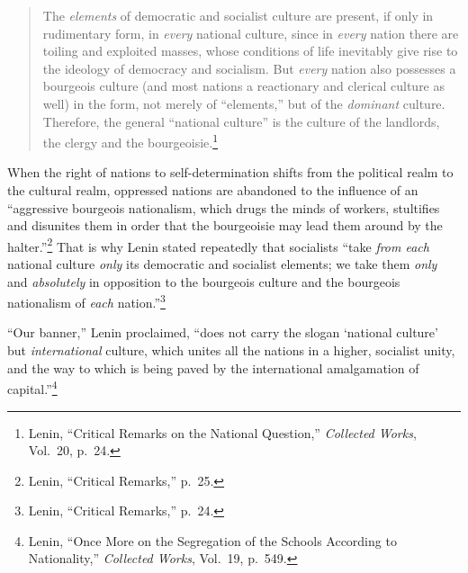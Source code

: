 \blockquote{The \emph{elements} of democratic and socialist culture are present, if only in rudimentary form, in \emph{every} national culture, since in \emph{every} nation there are toiling and exploited masses, whose conditions of life inevitably give rise to the ideology of democracy and socialism. But \emph{every} nation also possesses a bourgeois culture (and most nations a reactionary and clerical culture as well) in the form, not merely of ``elements,'' but of the \emph{dominant} culture. Therefore, the general ``national culture'' is the culture of the landlords, the clergy and the bourgeoisie.\footnote{Lenin, ``Critical Remarks on the National Question,'' \emph{Collected Works}, Vol.\ 20, p.\ 24.}}

When the right of nations to self-determination shifts from the political realm to the cultural realm, oppressed nations are abandoned to the influence of an ``aggressive bourgeois nationalism, which drugs the minds of workers, stultifies and disunites them in order that the bourgeoisie may lead them around by the halter.''\footnote{Lenin, ``Critical Remarks,'' p.\ 25.} That is why Lenin stated repeatedly that socialists ``take \emph{from each} national culture \emph{only} its democratic and socialist elements; we take them \emph{only} and \emph{absolutely} in opposition to the bourgeois culture and the bourgeois nationalism of \emph{each} nation.''\footnote{Lenin, ``Critical Remarks,'' p.\ 24.}

``Our banner,'' Lenin proclaimed, ``does not carry the slogan `national culture' but \emph{international} culture, which unites all the nations in a higher, socialist unity, and the way to which is being paved by the international amalgamation of capital.''\footnote{Lenin, ``Once More on the Segregation of the Schools According to Nationality,'' \emph{Collected Works}, Vol.\ 19, p.\ 549.}
